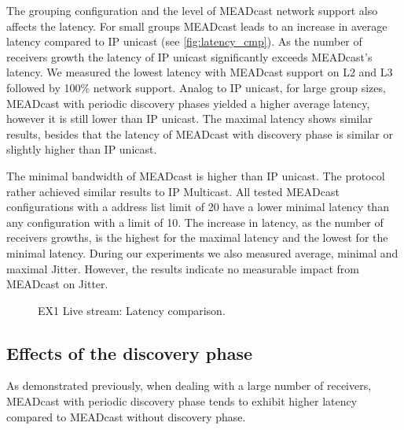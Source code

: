 The grouping configuration and the level of MEADcast network support also
    affects the latency.
For small groups MEADcast leads to an increase in average latency compared to
    IP unicast (see \autoref{fig:latency_cmp}).
As the number of receivers growth the latency of IP unicast significantly
    exceeds MEADcast's latency.
We measured the lowest latency with MEADcast support on L2 and L3 followed by
    100\% network support.
Analog to IP unicast, for large group sizes, MEADcast with periodic discovery
    phases yielded a higher average latency, however it is still lower than IP
    unicast.
The maximal latency shows similar results, besides that the latency of MEADcast
    with discovery phase is similar or slightly higher than IP unicast.

The minimal bandwidth of MEADcast is higher than IP unicast.
The protocol rather achieved similar results to IP Multicast.
All tested MEADcast configurations with a address list limit of 20 have a lower
    minimal latency than any configuration with a limit of 10.
The increase in latency, as the number of receivers growths, is the highest for
    the maximal latency and the lowest for the minimal latency.
During our experiments we also measured average, minimal and maximal Jitter.
However, the results indicate no measurable impact from MEADcast on Jitter.

\begin{figure}
    \begin{center}
        
    \end{center}
    \caption[EX1 Live stream: Latency comparison]{
        EX1 Live stream: Latency comparison.
    }
    \label{fig:latency_cmp}
\end{figure}



\subsection{Effects of the discovery phase} %
\label{sub:Results_Effects of the Discovery phase}

As demonstrated previously, when dealing with a large number of receivers,
    MEADcast with periodic discovery phase tends to exhibit higher latency
    compared to MEADcast without discovery phase.

